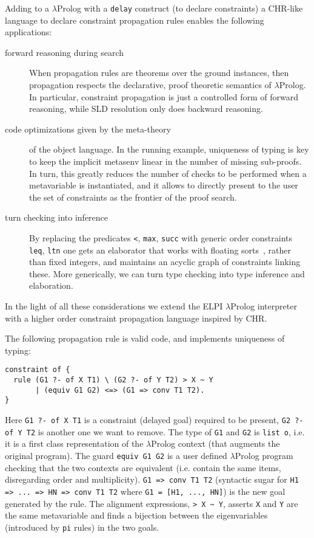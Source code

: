\documentclass{easychair}
\begin{document}
Adding to a $\lambda$Prolog with a \verb+delay+ construct (to declare constraints) a CHR-like language to declare constraint propagation rules
enables the following applications:
\begin{description}
\item[forward reasoning during search] When propagation rules are theorems
        over the ground instances,
	then propagation respects the declarative, proof theoretic semantics
        of $\lambda$Prolog. In particular, constraint propagation is just a
        controlled form of forward reasoning, while SLD resolution only
	does backward reasoning.
\item[code optimizations given by the meta-theory] of the object
	language.  In the running example, uniqueness of typing is key to keep
	the implicit metasenv linear in the number of missing sub-proofs.
        In turn, this greatly reduces the number of checks to be performed when
        a metavariable is instantiated, and it allows to directly present to
        the user the set of constraints as the frontier of the proof search.
\item[turn checking into inference]  By replacing the
	predicates \verb+<+, \verb+max+, \verb+succ+ with generic 
	order constraints
	\verb+leq+, \verb+ltn+ one gets an elaborator that works with 
	floating sorts~\cite{algebraic},
	rather than fixed integers, and maintains an acyclic graph of
	constraints linking these. More generically, we can turn type checking into type inference and elaboration.
\end{description}

In the light of all these considerations we extend the ELPI
$\lambda$Prolog interpreter with a higher order constraint propagation
language inspired by CHR.

The following propagation rule is valid code, and implements
uniqueness of typing:

\begin{Verbatim}
constraint of {
  rule (G1 ?- of X T1) \ (G2 ?- of Y T2) > X ~ Y
       | (equiv G1 G2) <=> (G1 => conv T1 T2).
}
\end{Verbatim}

Here \verb+G1 ?- of X T1+ is a constraint (delayed goal) required
to be present, \verb+G2 ?- of Y T2+ is another one we want to remove.
The type of \verb+G1+ and \verb+G2+ is \verb+list o+, i.e.
it is a first class representation of the $\lambda$Prolog context
(that augments the original program).  
The guard \verb+equiv G1 G2+ is a user defined $\lambda$Prolog program
checking that the two contexts are equivalent (i.e.
contain the same items, disregarding order and multiplicity).  \verb+G1 => conv T1 T2+ (syntactic sugar for \verb+H1 => ... => HN => conv T1 T2+ where
\verb+G1 = [H1, ..., HN]+) is the new goal generated by the rule.
The alignment expressions, \verb+> X ~ Y+, asserts \verb+X+ and \verb+Y+
are the same metavariable and finds a bijection between the
eigenvariables (introduced by \verb+pi+ rules) in the two goals.
\end{document}
